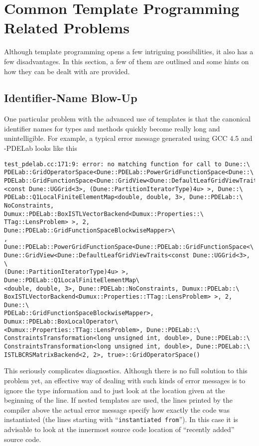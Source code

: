 \section{Common Template Programming Related Problems}

Although \Cplusplus template programming opens a few intriguing
possibilities, it also has a few disadvantages. In this section, a few
of them are outlined and some hints on how they can be dealt with are
provided.

\subsection*{Identifier-Name Blow-Up}

One particular problem with the advanced use of \Cplusplus templates is that the
canonical identifier names for types and methods quickly become really
long and unintelligible. For example, a typical error message
generated using GCC 4.5 and \Dune-PDELab looks like this
\begin{lstlisting}[basicstyle=\ttfamily\scriptsize, numbersep=5pt]
test_pdelab.cc:171:9: error: no matching function for call to Dune::\
PDELab::GridOperatorSpace<Dune::PDELab::PowerGridFunctionSpace<Dune::\
PDELab::GridFunctionSpace<Dune::GridView<Dune::DefaultLeafGridViewTraits\
<const Dune::UGGrid<3>, (Dune::PartitionIteratorType)4u> >, Dune::\
PDELab::Q1LocalFiniteElementMap<double, double, 3>, Dune::PDELab::\
NoConstraints, Dumux::PDELab::BoxISTLVectorBackend<Dumux::Properties::\
TTag::LensProblem> >, 2, Dune::PDELab::GridFunctionSpaceBlockwiseMapper>\
, Dune::PDELab::PowerGridFunctionSpace<Dune::PDELab::GridFunctionSpace<\
Dune::GridView<Dune::DefaultLeafGridViewTraits<const Dune::UGGrid<3>, \
(Dune::PartitionIteratorType)4u> >, Dune::PDELab::Q1LocalFiniteElementMap\
<double, double, 3>, Dune::PDELab::NoConstraints, Dumux::PDELab::\
BoxISTLVectorBackend<Dumux::Properties::TTag::LensProblem> >, 2, Dune::\
PDELab::GridFunctionSpaceBlockwiseMapper>, Dumux::PDELab::BoxLocalOperator\
<Dumux::Properties::TTag::LensProblem>, Dune::PDELab::\
ConstraintsTransformation<long unsigned int, double>, Dune::PDELab::\
ConstraintsTransformation<long unsigned int, double>, Dune::PDELab::\
ISTLBCRSMatrixBackend<2, 2>, true>::GridOperatorSpace()
\end{lstlisting}
This seriously complicates diagnostics. Although there is no full
solution to this problem yet, an effective way of dealing with such
kinds of error messages is to ignore the type information and to just
look at the location given at the beginning of the line. If nested
templates are used, the lines printed by the compiler above the actual
error message specify how exactly the code was instantiated (the lines
starting with ``\texttt{instantiated from}''). In this case it is
advisable to look at the innermost source code location of ``recently
added'' source code.


